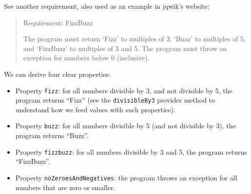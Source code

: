 See another requirement, also used as an example in jqwik's website:

\begin{quote}
Requirement: FizzBuzz

The program must return `Fizz' to multiples of 3, `Buzz' to multiples of
5, and `FizzBuzz' to multiples of 3 and 5. The program must throw an
exception for numbers below 0 (inclusive).
\end{quote}

We can derive four clear properties:

\begin{itemize}
\tightlist
\item
  Property \texttt{fizz}: for all numbers divisible by 3, and not
  divisible by 5, the program returns ``Fizz'' (see the
  \texttt{divisibleBy3} provider method to understand how we feed values
  with such properties).
\item
  Property \texttt{buzz}: for all numbers divisible by 5 (and not
  divisible by 3), the program returns ``Buzz''.
\item
  Property \texttt{fizzbuzz}: for all numbers divisible by 3 and 5, the
  program returns ``FizzBuzz''.
\item
  Property \texttt{noZeroesAndNegatives}: the program throws an
  exception for all numbers that are zero or smaller.
\end{itemize}

